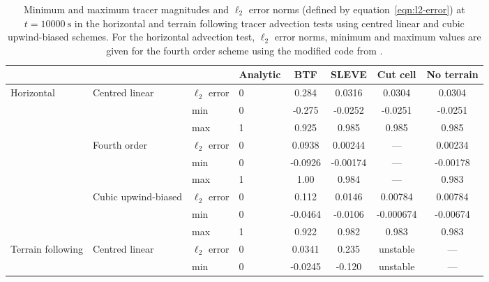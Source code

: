 \documentclass{ametsoc}
\begin{document}
\begin{table*}
	\caption{Minimum and maximum tracer magnitudes and \(\ell_2\) error norms (defined by equation~\ref{eqn:l2-error}) at \(t = \SI{10000}{\second}\) in the horizontal and terrain following tracer advection tests using centred linear and cubic upwind-biased schemes.  For the horizontal advection test, \(\ell_2\) error norms, minimum and maximum values are given for the fourth order scheme using the modified code from \citet{schaer2002}.}
\label{tab:advection}
%
\centering
\footnotesize
\begin{tabular}{l l l l S S S S}
\hline\hline
                  &                     &                  & Analytic & {BTF}   & {SLEVE}         & {Cut cell}     & {No terrain} \\
\hline
Horizontal        & Centred linear      & \(\ell_2\) error & 0        & 0.284   & 0.0316          & 0.0304         & 0.0304      \\
                  &                     & min              & 0        & -0.275  & -0.0252         & -0.0251        & -0.0251     \\
                  &                     & max              & 1        & 0.925   & 0.985           & 0.985          & 0.985       \\
                  & Fourth order        & \(\ell_2\) error & 0        & 0.0938  & 0.00244         & {---}          & 0.00234     \\
                  &                     & min              & 0        & -0.0926 & -0.00174        & {---}          & -0.00178    \\
                  &                     & max              & 1        & 1.00    & 0.984           & {---}          & 0.983       \\
                  & Cubic upwind-biased & \(\ell_2\) error & 0        & 0.112   & 0.0146          & 0.00784        & 0.00784     \\
                  &                     & min              & 0        & -0.0464 & -0.0106         & -0.000674      & -0.00674    \\
                  &                     & max              & 1        & 0.922   & 0.982           & 0.983          & 0.983       \\
\hline
Terrain following & Centred linear      & \(\ell_2\) error & 0        & 0.0341  & 0.235           & {unstable}     & {---}        \\
	          &                     & min              & 0        & -0.0245 & -0.120          & {unstable}     & {---}        \\

\end{tabular}
\end{table*}
\end{document}
